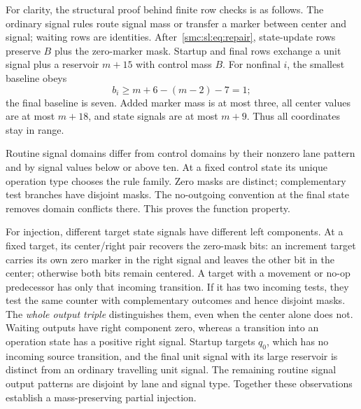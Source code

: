 \documentclass[11pt,letterpaper]{article}
\numberwithin{equation}{section}
\theoremstyle{definition}
\theoremstyle{remark}
\begin{document}
For clarity, the structural proof behind finite row checks is as follows. The ordinary signal rules route signal mass or transfer a marker between center and signal; waiting rows are identities. After~\eqref{smc:sl:eq:repair}, state-update rows preserve $B$ plus the zero-marker mask. Startup and final rows exchange a unit signal plus a reservoir $m+15$ with control mass $B$. For nonfinal $i$, the smallest baseline obeys
\[
 b_i\ge m+6-(m-2)-7=1;
\]
the final baseline is seven. Added marker mass is at most three, all center values are at most $m+18$, and state signals are at most $m+9$. Thus all coordinates stay in range.

Routine signal domains differ from control domains by their nonzero lane pattern and by signal values below or above ten. At a fixed control state its unique operation type chooses the rule family. Zero masks are distinct; complementary test branches have disjoint masks. The no-outgoing convention at the final state removes domain conflicts there. This proves the function property.

For injection, different target state signals have different left components. At a fixed target, its center/right pair recovers the zero-mask bits: an increment target carries its own zero marker in the right signal and leaves the other bit in the center; otherwise both bits remain centered. A target with a movement or no-op predecessor has only that incoming transition. If it has two incoming tests, they test the same counter with complementary outcomes and hence disjoint masks. The \emph{whole output triple} distinguishes them, even when the center alone does not. Waiting outputs have right component zero, whereas a transition into an operation state has a positive right signal. Startup targets $q_0$, which has no incoming source transition, and the final unit signal with its large reservoir is distinct from an ordinary travelling unit signal. The remaining routine signal output patterns are disjoint by lane and signal type. Together these observations establish a mass-preserving partial injection.
\end{document}
